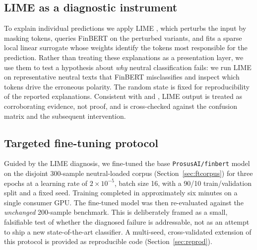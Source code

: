 \documentclass{aims}
\numberwithin{equation}{section}
\begin{document}
\subsection{LIME as a diagnostic instrument}\label{sec:limemethod}
To explain individual predictions we apply LIME \citep{ribeiro2016}, which perturbs
the input by masking tokens, queries FinBERT on the perturbed variants, and fits a
sparse local linear surrogate whose weights identify the tokens most responsible for
the prediction. Rather than treating these explanations as a presentation layer, we
use them to test a hypothesis about \emph{why} neutral classification fails: we run
LIME on representative neutral texts that FinBERT misclassifies and inspect which
tokens drive the erroneous polarity. The random state is fixed for reproducibility
of the reported explanations. Consistent with \citet{slack2020} and \citet{rudin2019},
LIME output is treated as corroborating evidence, not proof, and is cross-checked
against the confusion matrix and the subsequent intervention.

\subsection{Targeted fine-tuning protocol}\label{sec:ftmethod}
Guided by the LIME diagnosis, we fine-tuned the base \texttt{ProsusAI/finbert} model
on the disjoint 300-sample neutral-loaded corpus (Section~\ref{sec:ftcorpus}) for
three epochs at a learning rate of $2\times10^{-5}$, batch size 16, with a 90/10
train/validation split and a fixed seed. Training completed in approximately six
minutes on a single consumer GPU. The fine-tuned model was then re-evaluated against
the \emph{unchanged} 200-sample benchmark. This is deliberately framed as a small,
falsifiable test of whether the diagnosed failure is addressable, not as an attempt
to ship a new state-of-the-art classifier. A multi-seed, cross-validated extension
of this protocol is provided as reproducible code (Section~\ref{sec:reprod}).
\end{document}
